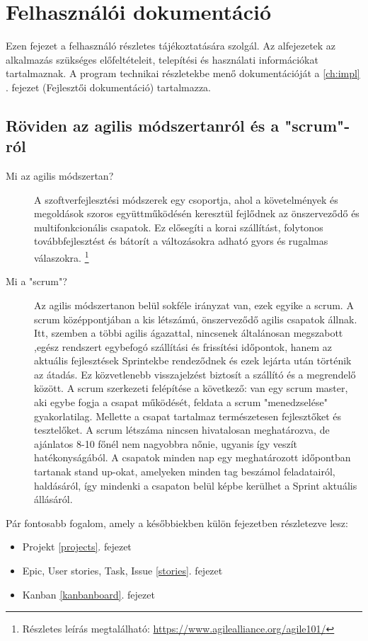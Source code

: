 \chapter{Felhasználói dokumentáció} %
\label{ch:user}

Ezen fejezet a felhasználó részletes tájékoztatására szolgál. Az alfejezetek az alkalmazás szükséges előfeltételeit, telepítési és használati információkat tartalmaznak. A program technikai részletekbe menő dokumentációját a \ref{ch:impl} . fejezet (Fejlesztői dokumentáció) tartalmazza.


\section{Röviden az agilis módszertanról és a  "scrum"-ról} %

\begin{description}
	\item[Mi az agilis módszertan?] A szoftverfejlesztési módszerek egy csoportja, ahol a követelmények és megoldások szoros együttműködésén keresztül fejlődnek az önszerveződő  és 		     	multifonkcionális csapatok. Ez elősegíti a korai szállítást, folytonos továbbfejlesztést és bátorít a változásokra adható gyors és rugalmas válaszokra. \footnote{Részletes leírás 		 	   	megtalálható: \url{https://www.agilealliance.org/agile101/}}
	\item[Mi a "scrum"?] Az agilis módszertanon belül sokféle irányzat van, ezek egyike a scrum. A scrum középpontjában a kis létszámú, önszerveződő agilis csapatok állnak. Itt,
 szemben a többi agilis ágazattal, nincsenek általánosan megszabott ,egész rendszert egybefogó szállítási és frissítési időpontok, hanem az aktuális fejlesztések Sprintekbe rendeződnek és ezek lejárta után történik az átadás. Ez közvetlenebb visszajelzést biztosít a szállító és a megrendelő között. A scrum szerkezeti felépítése a következő: van egy scrum master, aki egybe fogja a csapat működését, feldata a scrum "menedzselése" gyakorlatilag. Mellette a csapat tartalmaz természetesen fejlesztőket és tesztelőket. A scrum létszáma nincsen hivatalosan meghatározva, de ajánlatos 8-10 főnél nem nagyobbra nőnie, ugyanis így veszít hatékonyságából. A csapatok minden nap egy meghatározott időpontban tartanak stand up-okat, amelyeken minden tag beszámol feladatairól, haldásáról, így mindenki a csapaton belül képbe kerülhet a Sprint aktuális állásáról.
\end{description}

Pár fontosabb fogalom, amely a későbbiekben külön fejezetben részletezve lesz:
\begin{itemize}
	\item Projekt \ref{projects}. fejezet
	\item Epic, User stories, Task, Issue \ref{stories}. fejezet
	\item Kanban \ref{kanbanboard}. fejezet
\end{itemize}

